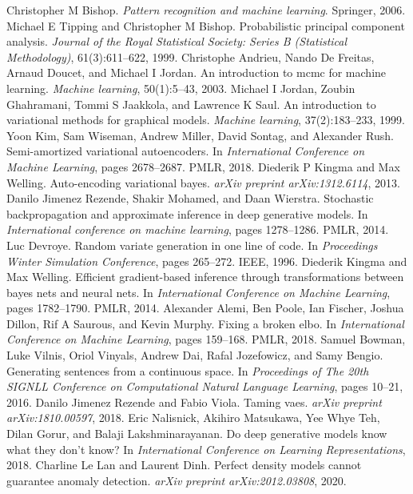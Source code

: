 \begin{chapterreferences}
 Christopher M Bishop. \textit{Pattern recognition and machine learning}. Springer, 2006.
 Michael E Tipping and Christopher M Bishop. Probabilistic principal component analysis. \textit{Journal of the Royal Statistical Society: Series B (Statistical Methodology)}, 61(3):611–622, 1999.
 Christophe Andrieu, Nando De Freitas, Arnaud Doucet, and Michael I Jordan. An introduction to mcmc for machine learning. \textit{Machine learning}, 50(1):5–43, 2003.
 Michael I Jordan, Zoubin Ghahramani, Tommi S Jaakkola, and Lawrence K Saul. An introduction to variational methods for graphical models. \textit{Machine learning}, 37(2):183–233, 1999.
 Yoon Kim, Sam Wiseman, Andrew Miller, David Sontag, and Alexander Rush. Semi-amortized variational autoencoders. In \textit{International Conference on Machine Learning}, pages 2678–2687. PMLR, 2018.
 Diederik P Kingma and Max Welling. Auto-encoding variational bayes. \textit{arXiv preprint arXiv:1312.6114}, 2013.
 Danilo Jimenez Rezende, Shakir Mohamed, and Daan Wierstra. Stochastic backpropagation and approximate inference in deep generative models. In \textit{International conference on machine learning}, pages 1278–1286. PMLR, 2014.
 Luc Devroye. Random variate generation in one line of code. In \textit{Proceedings Winter Simulation Conference}, pages 265–272. IEEE, 1996.
 Diederik Kingma and Max Welling. Efficient gradient-based inference through transformations between bayes nets and neural nets. In \textit{International Conference on Machine Learning}, pages 1782–1790. PMLR, 2014.
 Alexander Alemi, Ben Poole, Ian Fischer, Joshua Dillon, Rif A Saurous, and Kevin Murphy. Fixing a broken elbo. In \textit{International Conference on Machine Learning}, pages 159–168. PMLR, 2018.
 Samuel Bowman, Luke Vilnis, Oriol Vinyals, Andrew Dai, Rafal Jozefowicz, and Samy Bengio. Generating sentences from a continuous space. In \textit{Proceedings of The 20th SIGNLL Conference on Computational Natural Language Learning}, pages 10–21, 2016.
 Danilo Jimenez Rezende and Fabio Viola. Taming vaes. \textit{arXiv preprint arXiv:1810.00597}, 2018.
 Eric Nalisnick, Akihiro Matsukawa, Yee Whye Teh, Dilan Gorur, and Balaji Lakshminarayanan. Do deep generative models know what they don’t know? In \textit{International Conference on Learning Representations}, 2018.
 Charline Le Lan and Laurent Dinh. Perfect density models cannot guarantee anomaly detection. \textit{arXiv preprint arXiv:2012.03808}, 2020.

\end{chapterreferences}
